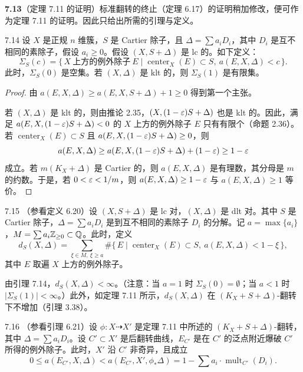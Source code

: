 \par\medskip\noindent\textbf{7.13}（定理 7.11 的证明）\quad 标准翻转的终止（定理 6.17）的证明稍加修改，便可作为定理 7.11 的证明。因此只给出所需的引理与定义。

\begin{lemmap}{7.14}
设 $X$ 是正规 $n$ 维簇，$S$ 是 Cartier 除子，且 $\Delta=\sum a_iD_i$，其中 $D_i$ 是互不相同的素除子，假设 $a_i\ge0$。假设 $(X,S+\Delta)$ 是 lc 的。如下定义：
\[
\Sigma_S(c)=\{\,X\ \text{上方的例外除子}\ E\mid \operatorname{center}_X(E)\subset S,\ a(E,X,\Delta)<c\,\}.
\]
此时，$\Sigma_S(0)$ 是空集。若 $(X,\Delta)$ 是 klt 的，则 $\Sigma_S(1)$ 是有限集。
\end{lemmap}

\begin{proof}
由 $a(E,X,\Delta)\ge a(E,X,S+\Delta)+1\ge0$ 得到第一个主张。

若 $(X,\Delta)$ 是 klt 的，则由推论 2.35，$(X,(1-\varepsilon)S+\Delta)$ 也是 klt 的。因此，满足 $a(E,X,(1-\varepsilon)S+\Delta)<0$ 的 $X$ 上方的例外除子 $E$ 只有有限个（命题 2.36）。若 $\operatorname{center}_X(E)\subset S$ 且 $a(E,X,(1-\varepsilon)S+\Delta)\ge0$，则
\[
a(E,X,\Delta)\ge a(E,X,(1-\varepsilon)S+\Delta)+(1-\varepsilon)\ge1-\varepsilon
\]
成立。若 $m(K_X+\Delta)$ 是 Cartier 的，则 $a(E,X,\Delta)$ 是有理数，其分母是 $m$ 的约数。于是，若 $0<\varepsilon<1/m$，则 $a(E,X,\Delta)\ge1-\varepsilon$ 与 $a(E,X,\Delta)\ge1$ 等价。
\end{proof}

\begin{definition}{7.15}
（参看定义 6.20）设 $(X,S+\Delta)$ 是 lc 对，$(X,\Delta)$ 是 dlt 对。其中 $S$ 是 Cartier 除子，$\Delta=\sum a_iD_i$ 是到互不相同的素除子 $D_i$ 的分解。记 $a=\max\{a_i\}$，$M=\sum a_i\mathbb{Z}_{\ge0}\subset\mathbb{Q}$。此时，定义
\[
d_S(X,\Delta)=\sum_{\xi\in M,\ \xi\ge a}\#\{\,E\mid \operatorname{center}_X(E)\subset S,\ a(E,X,\Delta)<1-\xi\,\},
\]
其中 $E$ 取遍 $X$ 上方的例外除子。

由引理 7.14，$d_S(X,\Delta)<\infty$。（注意：当 $a=1$ 时 $\Sigma_S(0)=\emptyset$；当 $a<1$ 时 $|\Sigma_S(1)|<\infty$。）此外，如定理 7.11 所示，$d_S(X,\Delta)$ 在 $(K_X+S+\Delta)$-翻转下不增加（引理 3.38）。
\end{definition}

\begin{lemma}{7.16}
（参看引理 6.21）设 $\phi\colon X\dashrightarrow X'$ 是定理 7.11 中所述的 $(K_X+S+\Delta)$-翻转，其中 $\Delta=\sum a_iD_i$。设 $C'\subset X'$ 是后翻转曲线，$E_{C'}$ 是在 $C'$ 的泛点附近爆破 $C'$ 所得的例外除子。此时，$X'$ 沿 $C'$ 非奇异，且成立
\[
0\le a(E_{C'},X,\Delta)<a(E_{C'},X',\phi_*\Delta)=1-\sum a_i\cdot\operatorname{mult}_{C'}(D_i).
\]
\end{lemma}

